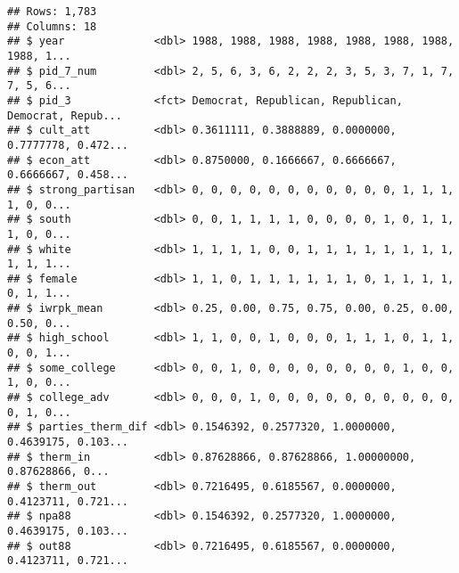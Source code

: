 \documentclass[
]{article}
\newenvironment{Shaded}{\begin{snugshade}}{\end{snugshade}}
\newcommand{\DataTypeTok}[1]{\textcolor[rgb]{0.13,0.29,0.53}{#1}}
\newcommand{\DecValTok}[1]{\textcolor[rgb]{0.00,0.00,0.81}{#1}}
\newcommand{\KeywordTok}[1]{\textcolor[rgb]{0.13,0.29,0.53}{\textbf{#1}}}
\newcommand{\NormalTok}[1]{#1}
\newcommand{\OperatorTok}[1]{\textcolor[rgb]{0.81,0.36,0.00}{\textbf{#1}}}
\newcommand{\StringTok}[1]{\textcolor[rgb]{0.31,0.60,0.02}{#1}}
\begin{document}
\begin{verbatim}
## Rows: 1,783
## Columns: 18
## $ year              <dbl> 1988, 1988, 1988, 1988, 1988, 1988, 1988, 1988, 1...
## $ pid_7_num         <dbl> 2, 5, 6, 3, 6, 2, 2, 2, 3, 5, 3, 7, 1, 7, 7, 5, 6...
## $ pid_3             <fct> Democrat, Republican, Republican, Democrat, Repub...
## $ cult_att          <dbl> 0.3611111, 0.3888889, 0.0000000, 0.7777778, 0.472...
## $ econ_att          <dbl> 0.8750000, 0.1666667, 0.6666667, 0.6666667, 0.458...
## $ strong_partisan   <dbl> 0, 0, 0, 0, 0, 0, 0, 0, 0, 0, 0, 1, 1, 1, 1, 0, 0...
## $ south             <dbl> 0, 0, 1, 1, 1, 1, 0, 0, 0, 0, 1, 0, 1, 1, 1, 0, 0...
## $ white             <dbl> 1, 1, 1, 1, 0, 0, 1, 1, 1, 1, 1, 1, 1, 1, 1, 1, 1...
## $ female            <dbl> 1, 1, 0, 1, 1, 1, 1, 1, 1, 0, 1, 1, 1, 1, 0, 1, 1...
## $ iwrpk_mean        <dbl> 0.25, 0.00, 0.75, 0.75, 0.00, 0.25, 0.00, 0.50, 0...
## $ high_school       <dbl> 1, 1, 0, 0, 1, 0, 0, 0, 1, 1, 1, 0, 1, 1, 0, 0, 1...
## $ some_college      <dbl> 0, 0, 1, 0, 0, 0, 0, 0, 0, 0, 0, 1, 0, 0, 1, 0, 0...
## $ college_adv       <dbl> 0, 0, 0, 1, 0, 0, 0, 0, 0, 0, 0, 0, 0, 0, 0, 1, 0...
## $ parties_therm_dif <dbl> 0.1546392, 0.2577320, 1.0000000, 0.4639175, 0.103...
## $ therm_in          <dbl> 0.87628866, 0.87628866, 1.00000000, 0.87628866, 0...
## $ therm_out         <dbl> 0.7216495, 0.6185567, 0.0000000, 0.4123711, 0.721...
## $ npa88             <dbl> 0.1546392, 0.2577320, 1.0000000, 0.4639175, 0.103...
## $ out88             <dbl> 0.7216495, 0.6185567, 0.0000000, 0.4123711, 0.721...
\end{verbatim}

\begin{Shaded}
\end{Shaded}
\end{document}
